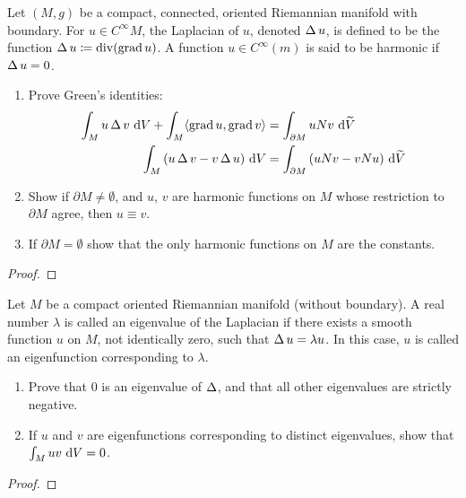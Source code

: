 \begin{problem}
Let $(M,g)$ be a compact, connected, oriented Riemannian manifold with
boundary. For $u\in C^\infty M$, the Laplacian of $u$, denoted $\operatorname{\Delta} u$,
is defined to be the function $\operatorname{\Delta} u\coloneqq \operatorname{div}(\operatorname{grad} u)$. A function
$u\in C^\infty(m)$ is said to be harmonic if $\operatorname{\Delta} u=0$.
\begin{enumerate}[label=(\alph*)]
\item Prove Green's identities:
\begin{align*}
\int_M u\operatorname{\Delta} v\,\operatorname{d\!} V+\int_M\langle\operatorname{grad} u,\operatorname{grad} v\rangle
&=\int_{\partial M}uNv\,\operatorname{d\!}\widetilde V\\
\int_M\left(u\operatorname{\Delta} v-v\operatorname{\Delta} u\right)\,\operatorname{d\!} V
&=\int_{\partial M}\left(uNv-vNu\right)\,\operatorname{d\!}\widetilde V
\end{align*}
\item Show if $\partial M\neq\emptyset$, and $u$, $v$ are harmonic
  functions on $M$ whose restriction to $\partial M$ agree, then $u\equiv
  v$.
\item If $\partial M=\emptyset$ show that the only harmonic functions on
  $M$ are the constants.
\end{enumerate}
\end{problem}
\begin{proof}
\end{proof}
\newpage

\begin{problem}
Let $M$ be a compact oriented Riemannian manifold (without boundary). A
real number $\lambda$ is called an eigenvalue of the Laplacian if
there exists a smooth function $u$ on $M$, not identically zero, such
that $\operatorname{\Delta} u=\lambda u$. In this case, $u$ is called an eigenfunction
corresponding to $\lambda$.
\begin{enumerate}[label=(\alph*)]
\item Prove that $0$ is an eigenvalue of $\operatorname{\Delta}$, and that all other
  eigenvalues are strictly negative.
\item If $u$ and $v$ are eigenfunctions corresponding to distinct
  eigenvalues, show that $\int_M uv\,\operatorname{d\!} V=0$.
\end{enumerate}
\end{problem}
\begin{proof}
\end{proof}

